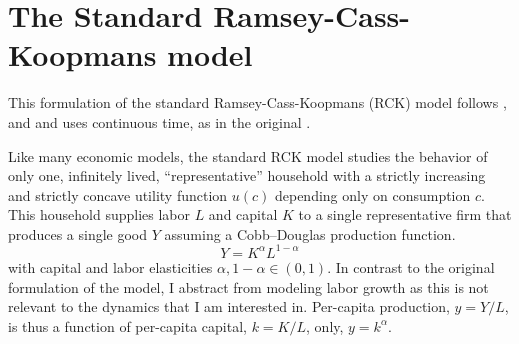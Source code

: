 \section{The Standard Ramsey-Cass-Koopmans model}
\label{sec:savings_standard_rck}

This formulation of the standard Ramsey-Cass-Koopmans (RCK) model follows \cite[p.287--317]{Acemoglu2009}, \cite[p.85--135]{Barro2004}  and \cite[p.38--90]{Blanchard1989} and uses continuous time, as in the original \citep{Ramsey1928}.

Like many economic models, the standard RCK model studies the behavior of only one, infinitely lived, ``representative'' household with a strictly increasing and strictly concave utility function $u(c)$ depending only on consumption $c$. This household supplies labor $L$ and capital $K$ to a single representative firm that produces a single good $Y$ assuming a Cobb--Douglas production function.
\begin{equation}
  Y \! =\! K^\alpha L^{1-\alpha}\label{eq:CD-Production}
\end{equation} 
with capital and labor elasticities $\alpha, 1 \!- \! \alpha \in (0,1)$.
In contrast to the original formulation of the model, I abstract from modeling labor growth as this is not relevant to the dynamics that I am interested in.
Per-capita production, $y \! =\! Y/L$, is thus a function of per-capita capital, $k \! =\! K/L$, only, $y \! =\! k^\alpha$.


